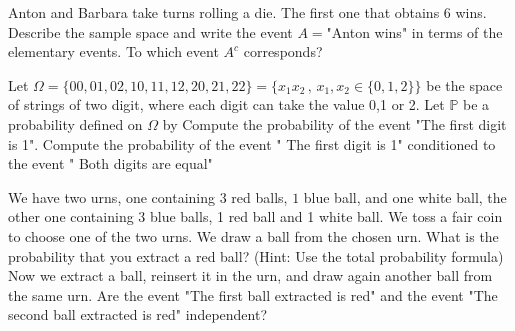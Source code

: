 \begin{ExerciseList}


	\Exercise Anton and Barbara take turns rolling a die. The first one that obtains 6 wins. Describe the sample space and write the event $A=$"Anton wins" in terms of the elementary events. To which event $A^c$ corresponds? 

	\Exercise Let $\Omega = \{00,01,02,10,11,12,20,21,22\}= \{x_1x_2\,,\,x_1,x_2\in\{0,1,2\}\}$ be the space of strings of two digit, where each digit can take the value 0,1 or 2. Let $\mathbb{P}$ be a probability defined on $\Omega$ by 
		 \Question Compute the probability of the event "The first digit is 1".
		 \Question Compute the probability of the event " The first digit is 1" conditioned to the event " Both digits are equal"
%
%

	\Exercise We have two urns, one containing $3$ red balls, $1$ blue ball, and one white ball, the other one containing 3 blue balls, 1 red ball and 1 white ball. We toss a fair coin to choose one of the two urns. 
    \Question We draw a ball from the chosen urn. What is the probability that you extract a red ball? (Hint: Use the total probability formula)
    \Question Now we extract a ball, reinsert it in the urn, and draw again another ball from the same urn. Are the event "The first ball extracted is red" and the event "The second  ball  extracted is red" independent? 



\end{ExerciseList}
